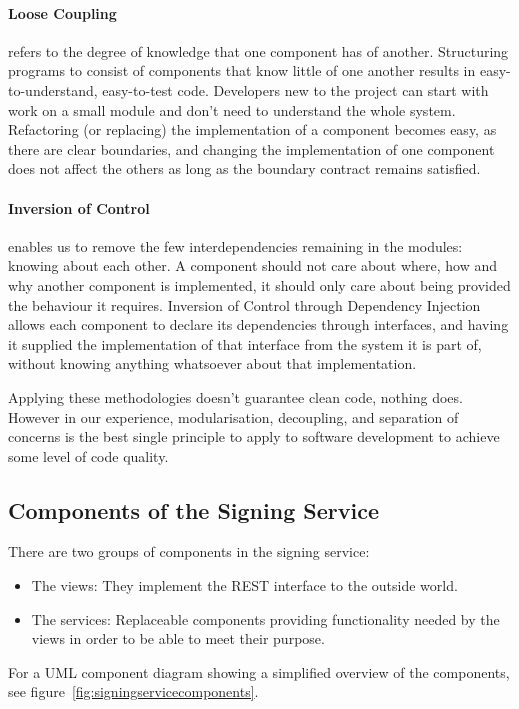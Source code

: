 \paragraph{Loose Coupling} refers to the degree of knowledge that one component has of another.
Structuring programs to consist of components that know little of one another
results in easy-to-understand, easy-to-test code.
Developers new to the project can start with work on a small module and don't need to understand the whole system.
Refactoring (or replacing) the implementation of a component becomes easy,
as there are clear boundaries,
and changing the implementation of one component does not affect the others as long as
the boundary contract remains satisfied.


\paragraph{Inversion of Control} enables us to remove the few interdependencies remaining in the modules:
knowing about each other.
A component should not care about where, how and why another component is implemented,
it should only care about being provided the behaviour it requires.
Inversion of Control through Dependency Injection allows each component to declare
its dependencies through interfaces,
and having it supplied the implementation of that interface from the system it is part of,
without knowing anything whatsoever about that implementation.

Applying these methodologies doesn't guarantee clean code, nothing does.
However in our experience, modularisation, decoupling, and separation of concerns is the best single principle
to apply to software development to achieve some level of code quality.

\subsection{Components of the Signing Service}\label{subsec:modules-of-the-signing-service}
There are two groups of components in the signing service:
\begin{itemize}
    \item The views: They implement the \gls{REST} interface to the outside world.
    \item The services: Replaceable components providing functionality needed by the views in order to
    be able to meet their purpose.
\end{itemize}

For a \gls{UML} component diagram showing a simplified overview of the components, see figure~\ref{fig:signingservicecomponents}.

